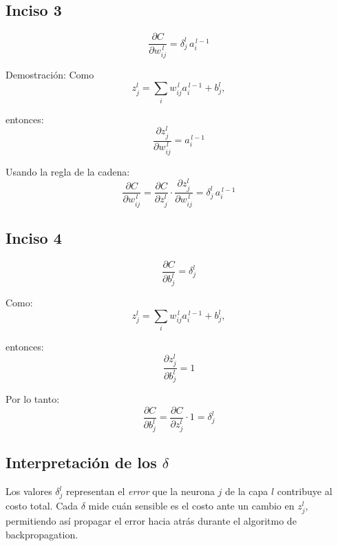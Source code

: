 \documentclass[12pt, a4paper]{article}
\begin{document}
        \subsection*{Inciso 3}
            \[ \frac{\partial C}{\partial w^{\,l}_{ij}} = \delta^l_j\, a^{\,l-1}_i \]
            
            \noindent Demostración: Como \[ z^l_j = \sum_i w^{\,l}_{ij} a^{\,l-1}_i + b^l_j, \]

            \noindent entonces: \[ \frac{\partial z^l_j}{\partial w^{\,l}_{ij}} = a^{\,l-1}_i \]

            \noindent Usando la regla de la cadena: \[ \frac{\partial C}{\partial w^{\,l}_{ij}} = \frac{\partial C}{\partial z^l_j} \cdot \frac{\partial z^l_j}{\partial w^{\,l}_{ij}} = \delta^l_j\, a^{\,l-1}_i \]
        \subsection*{Inciso 4}
            \[ \frac{\partial C}{\partial b^l_j} = \delta^l_j \]

            \noindent Como: \[ z^l_j = \sum_i w^{\,l}_{ij} a^{\,l-1}_i + b^l_j, \] 

            \noindent entonces: \[ \frac{\partial z^l_j}{\partial b^l_j} = 1 \]

            \noindent Por lo tanto: \[ \frac{\partial C}{\partial b^l_j} = \frac{\partial C}{\partial z^l_j} \cdot 1 = \delta^l_j \]
        \subsection*{Interpretación de los $\delta$}
            Los valores $\delta^{l}_{j}$ representan el \emph{error} que la neurona $j$ de la capa $l$ contribuye al costo total. Cada $\delta$ mide cuán sensible es el costo ante un cambio en $z^{l}_{j}$, permitiendo así propagar el error hacia atrás durante el algoritmo de backpropagation.
\end{document}

